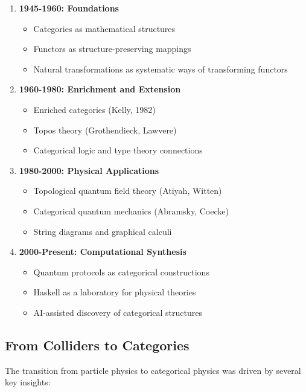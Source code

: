 \begin{enumerate}[leftmargin=*]
\item \textbf{1945-1960: Foundations}
   \begin{itemize}
   \item Categories as mathematical structures
   \item Functors as structure-preserving mappings
   \item Natural transformations as systematic ways of transforming functors
   \end{itemize}

\item \textbf{1960-1980: Enrichment and Extension}
   \begin{itemize}
   \item Enriched categories (Kelly, 1982)
   \item Topos theory (Grothendieck, Lawvere)
   \item Categorical logic and type theory connections
   \end{itemize}

\item \textbf{1980-2000: Physical Applications}
   \begin{itemize}
   \item Topological quantum field theory (Atiyah, Witten)
   \item Categorical quantum mechanics (Abramsky, Coecke)
   \item String diagrams and graphical calculi
   \end{itemize}

\item \textbf{2000-Present: Computational Synthesis}
   \begin{itemize}
   \item Quantum protocols as categorical constructions
   \item Haskell as a laboratory for physical theories
   \item AI-assisted discovery of categorical structures
   \end{itemize}
\end{enumerate}

\subsection{From Colliders to Categories}

The transition from particle physics to categorical physics was driven by several key insights:

